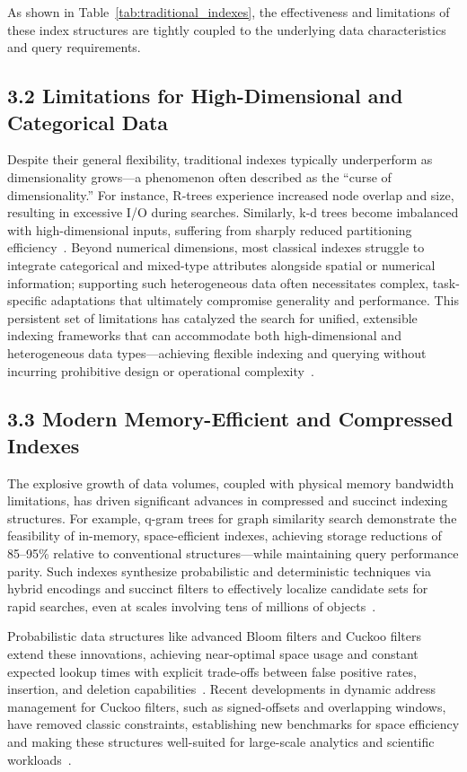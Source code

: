 \documentclass[11pt]{article}
\begin{document}
As shown in Table~\ref{tab:traditional_indexes}, the effectiveness and limitations of these index structures are tightly coupled to the underlying data characteristics and query requirements.

\subsection{3.2 Limitations for High-Dimensional and Categorical Data}

Despite their general flexibility, traditional indexes typically underperform as dimensionality grows—a phenomenon often described as the “curse of dimensionality.” For instance, R-trees experience increased node overlap and size, resulting in excessive I/O during searches. Similarly, k-d trees become imbalanced with high-dimensional inputs, suffering from sharply reduced partitioning efficiency~\cite{111,112}. Beyond numerical dimensions, most classical indexes struggle to integrate categorical and mixed-type attributes alongside spatial or numerical information; supporting such heterogeneous data often necessitates complex, task-specific adaptations that ultimately compromise generality and performance. This persistent set of limitations has catalyzed the search for unified, extensible indexing frameworks that can accommodate both high-dimensional and heterogeneous data types—achieving flexible indexing and querying without incurring prohibitive design or operational complexity~\cite{111,112}.

\subsection{3.3 Modern Memory-Efficient and Compressed Indexes}

The explosive growth of data volumes, coupled with physical memory bandwidth limitations, has driven significant advances in compressed and succinct indexing structures. For example, q-gram trees for graph similarity search demonstrate the feasibility of in-memory, space-efficient indexes, achieving storage reductions of 85--95\% relative to conventional structures—while maintaining query performance parity. Such indexes synthesize probabilistic and deterministic techniques via hybrid encodings and succinct filters to effectively localize candidate sets for rapid searches, even at scales involving tens of millions of objects~\cite{80}. 

Probabilistic data structures like advanced Bloom filters and Cuckoo filters extend these innovations, achieving near-optimal space usage and constant expected lookup times with explicit trade-offs between false positive rates, insertion, and deletion capabilities~\cite{81,82}. Recent developments in dynamic address management for Cuckoo filters, such as signed-offsets and overlapping windows, have removed classic constraints, establishing new benchmarks for space efficiency and making these structures well-suited for large-scale analytics and scientific workloads~\cite{82}.
 
\end{document}
